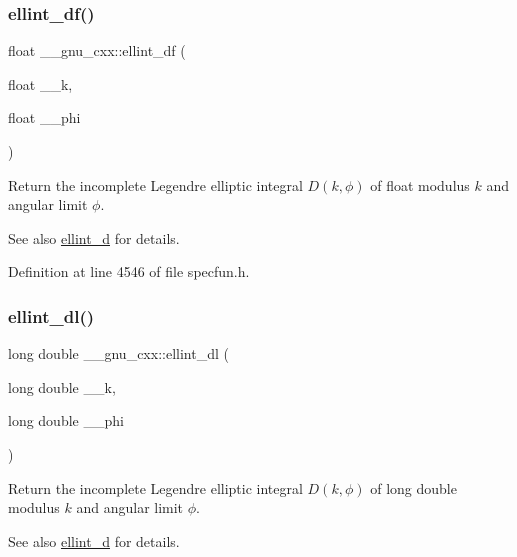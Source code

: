\subsubsection{\texorpdfstring{ellint\+\_\+df()}{ellint\_df()}}
{\footnotesize\ttfamily float \+\_\+\+\_\+gnu\+\_\+cxx\+::ellint\+\_\+df (\begin{DoxyParamCaption}\item[{float}]{\+\_\+\+\_\+k,  }\item[{float}]{\+\_\+\+\_\+phi }\end{DoxyParamCaption})\hspace{0.3cm}{\ttfamily [inline]}}

Return the incomplete Legendre elliptic integral $ D(k, \phi) $ of {\ttfamily float} modulus $ k $ and angular limit $ \phi $.

\begin{DoxySeeAlso}{See also}
\hyperlink{group__gnu__math__spec__func_gad75103894786e6d7766bac4d8447b6cc}{ellint\+\_\+d} for details. 
\end{DoxySeeAlso}


Definition at line 4546 of file specfun.\+h.

\mbox{\label{group__gnu__math__spec__func_gaa34bcb8e316f2e8b2b2bf48cd89abd98}} 
\subsubsection{\texorpdfstring{ellint\+\_\+dl()}{ellint\_dl()}}
{\footnotesize\ttfamily long double \+\_\+\+\_\+gnu\+\_\+cxx\+::ellint\+\_\+dl (\begin{DoxyParamCaption}\item[{long double}]{\+\_\+\+\_\+k,  }\item[{long double}]{\+\_\+\+\_\+phi }\end{DoxyParamCaption})\hspace{0.3cm}{\ttfamily [inline]}}

Return the incomplete Legendre elliptic integral $ D(k, \phi) $ of {\ttfamily long double} modulus $ k $ and angular limit $ \phi $.

\begin{DoxySeeAlso}{See also}
\hyperlink{group__gnu__math__spec__func_gad75103894786e6d7766bac4d8447b6cc}{ellint\+\_\+d} for details. 
\end{DoxySeeAlso}


